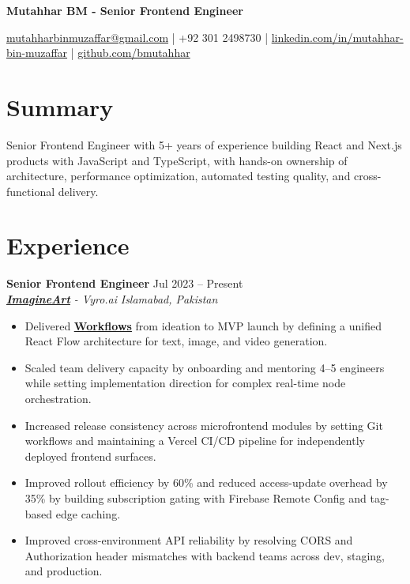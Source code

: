 \documentclass[9pt,letterpaper]{article}
\newcommand{\resumeHeader}[1]{%
  \begin{center}
    \vspace{0pt}
    {\fontsize{18pt}{20pt}\selectfont\bfseries #1\par}
    \vspace{0pt}
  \end{center}
}
\newcommand{\role}[4]{\textbf{#1} \hfill #2 \\
\textit{#3} \hfill \textit{#4}\\[-5pt]}
\begin{document}
\resumeHeader{Mutahhar BM - Senior Frontend Engineer}
\begin{center}
\fontsize{9pt}{10pt}\selectfont
\href{mailto:mutahharbinmuzaffar@gmail.com}{mutahharbinmuzaffar@gmail.com} \;|\; +92 301 2498730 \;|\;
\href{https://www.linkedin.com/in/mutahhar-bin-muzaffar}{linkedin.com/in/mutahhar-bin-muzaffar} \;|\;
\href{https://github.com/bmutahhar}{github.com/bmutahhar}
\end{center}

\section*{Summary}
Senior Frontend Engineer with 5+ years of experience building React and Next.js products with JavaScript and TypeScript, with hands-on ownership of architecture, performance optimization, automated testing quality, and cross-functional delivery.

\section*{Experience}
\role{Senior Frontend Engineer}{Jul 2023 -- Present}{\href{https://www.imagine.art/}{\textbf{\underline{ImagineArt}}} - Vyro.ai}{Islamabad, Pakistan}
\begin{itemize}[leftmargin=*, itemsep=0pt, topsep=0pt, partopsep=0pt, parsep=0pt, after=\vspace{1pt}]
  \item Delivered \href{https://www.imagine.art/flow}{\textbf{\underline{Workflows}}} from ideation to MVP launch by defining a unified React Flow architecture for text, image, and video generation.
  \item Scaled team delivery capacity by onboarding and mentoring 4--5 engineers while setting implementation direction for complex real-time node orchestration.
  \item Increased release consistency across microfrontend modules by setting Git workflows and maintaining a Vercel CI/CD pipeline for independently deployed frontend surfaces.
  \item Improved rollout efficiency by 60\% and reduced access-update overhead by 35\% by building subscription gating with Firebase Remote Config and tag-based edge caching.
  \item Improved cross-environment API reliability by resolving CORS and Authorization header mismatches with backend teams across dev, staging, and production.
\end{itemize}
\end{document}
